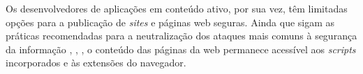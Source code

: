 Os desenvolvedores de aplicações em conteúdo ativo, por sua vez, têm limitadas opções para a publicação de \textit{sites} e páginas web seguras. Ainda que sigam as práticas recomendadas para a neutralização dos ataques mais comuns à segurança da informação \cite{W3C:CORS}, \cite{W3C:SOP}, \cite{W3C:CSP}, o conteúdo das páginas da web permanece acessível aos \textit{scripts} incorporados e às extensões do navegador.



